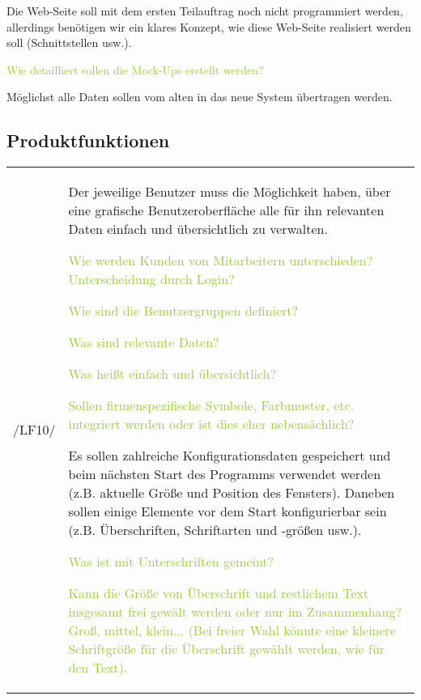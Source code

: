 Die Web-Seite soll mit dem ersten Teilauftrag noch nicht programmiert werden, allerdings benötigen wir ein klares Konzept, wie diese Web-Seite realisiert werden soll (Schnittstellen usw.).  

\textcolor{YellowGreen}{Wie detailliert sollen die Mock-Ups erstellt werden?}

Möglichst alle Daten sollen vom alten in das neue System übertragen werden. 
\newpage

\subsection{Produktfunktionen}

\begin{tabular}{l | p{13cm}}
    \hline
    /LF10/ & Der jeweilige Benutzer muss die Möglichkeit haben, über eine grafische Benutzeroberfläche alle für ihn relevanten Daten einfach und übersichtlich zu verwalten. 

    \textcolor{YellowGreen}{Wie werden Kunden von Mitarbeitern unterschieden? Unterscheidung durch Login?}

    \textcolor{NavyBlue}{}

    \textcolor{YellowGreen}{Wie sind die Benutzergruppen definiert?}

    \textcolor{NavyBlue}{}

    \textcolor{YellowGreen}{Was sind relevante Daten?}

    \textcolor{NavyBlue}{}

    \textcolor{YellowGreen}{Was heißt einfach und übersichtlich?}

    \textcolor{NavyBlue}{}

    \textcolor{YellowGreen}{Sollen firmenspezifische Symbole, Farbmuster, etc. integriert werden oder ist dies eher nebensächlich?}

    \textcolor{NavyBlue}{}

    Es sollen zahlreiche Konfigurationsdaten gespeichert und beim nächsten Start des Programms verwendet werden (z.B. aktuelle Größe und Position des Fensters). Daneben sollen einige Elemente vor dem Start konfigurierbar sein (z.B. Überschriften, Schriftarten und -größen usw.). 
    
    \textcolor{YellowGreen}{Was ist mit Unterschriften gemeint?}

    \textcolor{NavyBlue}{}

    \textcolor{YellowGreen}{Kann die Größe von Überschrift und restlichem Text insgesamt frei gewält werden oder nur im Zusammenhang? Groß, mittel, klein... (Bei freier Wahl könnte eine kleinere Schriftgröße für die Überschrift gewählt werden, wie für den Text).}


\end{tabular}
